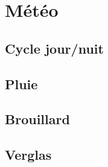 \section{Météo}
\subsection{Cycle jour/nuit}
\subsection{Pluie}
\subsection{Brouillard}
\subsection{Verglas}